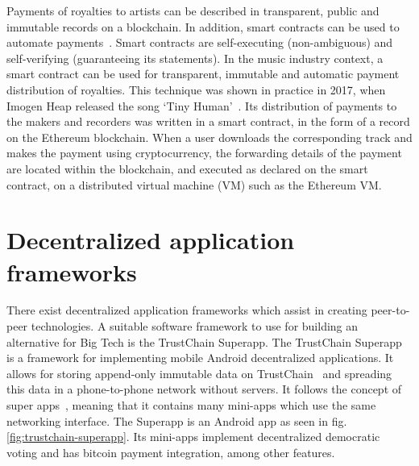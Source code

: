 Payments of royalties to artists can be described in transparent, public and immutable records on a blockchain. In addition, smart contracts can be used to automate payments~\citep{buterin2014next}. Smart contracts are self-executing (non-ambiguous) and self-verifying (guaranteeing its statements). In the music industry context, a smart contract can be used for transparent, immutable and automatic payment distribution of royalties. This technique was shown in practice in 2017, when Imogen Heap released the song `Tiny Human'~\citep{heap2017blockchain}. Its distribution of payments to the makers and recorders was written in a smart contract, in the form of a record on the Ethereum blockchain. When a user downloads the corresponding track and makes the payment using cryptocurrency, the forwarding details of the payment are located within the blockchain, and executed as declared on the smart contract, on a distributed virtual machine (VM) such as the Ethereum VM.


\section{Decentralized application frameworks}
\label{sec:sote-trustchain}
There exist decentralized application frameworks which assist in creating peer-to-peer technologies. A suitable software framework to use for building an alternative for Big Tech is the TrustChain Superapp. The TrustChain Superapp~\citep{mattskala2020} is a framework for implementing mobile Android decentralized applications. It allows for storing append-only immutable data on TrustChain~\citep{otte2017trustchain} and spreading this data in a phone-to-phone network without servers. It follows the concept of super apps~\citep{kpmg2019superapps}, meaning that it contains many mini-apps which use the same networking interface. The Superapp is an Android app as seen in fig. \ref{fig:trustchain-superapp}. Its mini-apps implement decentralized democratic voting and has bitcoin payment integration, among other features.

